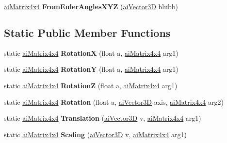 \begin{DoxyCompactItemize}
\item 
\hypertarget{structai_matrix4x4_ab9155c18730f2f10d6e834f3fd839ca5}{\hyperlink{structai_matrix4x4}{ai\+Matrix4x4} {\bfseries From\+Euler\+Angles\+X\+Y\+Z} (\hyperlink{structai_vector3_d}{ai\+Vector3\+D} blubb)}\label{structai_matrix4x4_ab9155c18730f2f10d6e834f3fd839ca5}

\end{DoxyCompactItemize}
\subsection*{Static Public Member Functions}
\begin{DoxyCompactItemize}
\item 
\hypertarget{structai_matrix4x4_ab94612e5cf1e3a536633e3f6087de694}{static \hyperlink{structai_matrix4x4}{ai\+Matrix4x4} {\bfseries Rotation\+X} (float a, \hyperlink{structai_matrix4x4}{ai\+Matrix4x4} arg1)}\label{structai_matrix4x4_ab94612e5cf1e3a536633e3f6087de694}

\item 
\hypertarget{structai_matrix4x4_a4cc78f14639c4607d78a37bfc1a0347a}{static \hyperlink{structai_matrix4x4}{ai\+Matrix4x4} {\bfseries Rotation\+Y} (float a, \hyperlink{structai_matrix4x4}{ai\+Matrix4x4} arg1)}\label{structai_matrix4x4_a4cc78f14639c4607d78a37bfc1a0347a}

\item 
\hypertarget{structai_matrix4x4_aae2fa6f8990150f08a0092297a3ed748}{static \hyperlink{structai_matrix4x4}{ai\+Matrix4x4} {\bfseries Rotation\+Z} (float a, \hyperlink{structai_matrix4x4}{ai\+Matrix4x4} arg1)}\label{structai_matrix4x4_aae2fa6f8990150f08a0092297a3ed748}

\item 
\hypertarget{structai_matrix4x4_ae4e7c6ac640c12013219915cc33ca3ea}{static \hyperlink{structai_matrix4x4}{ai\+Matrix4x4} {\bfseries Rotation} (float a, \hyperlink{structai_vector3_d}{ai\+Vector3\+D} axis, \hyperlink{structai_matrix4x4}{ai\+Matrix4x4} arg2)}\label{structai_matrix4x4_ae4e7c6ac640c12013219915cc33ca3ea}

\item 
\hypertarget{structai_matrix4x4_a6ecc5ae09087b2eb7a6fe9b9ca48bc35}{static \hyperlink{structai_matrix4x4}{ai\+Matrix4x4} {\bfseries Translation} (\hyperlink{structai_vector3_d}{ai\+Vector3\+D} v, \hyperlink{structai_matrix4x4}{ai\+Matrix4x4} arg1)}\label{structai_matrix4x4_a6ecc5ae09087b2eb7a6fe9b9ca48bc35}

\item 
\hypertarget{structai_matrix4x4_a57a12380a4140ec71838f4b1a4596ce2}{static \hyperlink{structai_matrix4x4}{ai\+Matrix4x4} {\bfseries Scaling} (\hyperlink{structai_vector3_d}{ai\+Vector3\+D} v, \hyperlink{structai_matrix4x4}{ai\+Matrix4x4} arg1)}\label{structai_matrix4x4_a57a12380a4140ec71838f4b1a4596ce2}


\end{DoxyCompactItemize}
